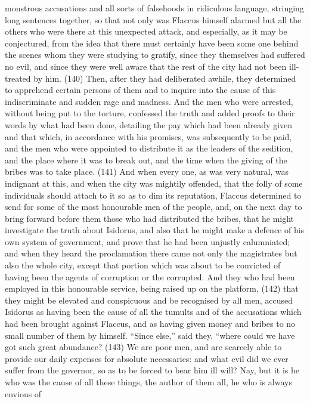 monstrous accusations and all sorts of falsehoods in ridiculous language, stringing long sentences
together, so that not only was Flaccus himself alarmed but all the others who were there at this
unexpected attack, and especially, as it may be conjectured, from the idea that there must certainly
have been some one behind the scenes whom they were studying to gratify, since they themselves
had suffered no evil, and since they were well aware that the rest of the city had not been ill-treated
by him. (140) Then, after they had deliberated awhile, they determined to apprehend certain
persons of them and to inquire into the cause of this indiscriminate and sudden rage and madness.
And the men who were arrested, without being put to the torture, confessed the truth and added
proofs to their words by what had been done, detailing the pay which had been already given and
that which, in accordance with his promises, was subsequently to be paid, and the men who were
appointed to distribute it as the leaders of the sedition, and the place where it was to break out, and
the time when the giving of the bribes was to take place. (141) And when every one, as was very
natural, was indignant at this, and when the city was mightily offended, that the folly of some
individuals should attach to it so as to dim its reputation, Flaccus determined to send for some of
the most honourable men of the people, and, on the next day to bring forward before them those
who had distributed the bribes, that he might investigate the truth about Isidorus, and also that he
might make a defence of his own system of government, and prove that he had been unjustly
calumniated; and when they heard the proclamation there came not only the magistrates but also
the whole city, except that portion which was about to be convicted of having been the agents of
corruption or the corrupted. And they who had been employed in this honourable service, being
raised up on the platform, (142) that they might be elevated and conspicuous and be recognised by
all men, accused Isidorus as having been the cause of all the tumults and of the accusations which
had been brought against Flaccus, and as having given money and bribes to no small number of
them by himself. ``Since else,'' said they, ``where could we have got such great abundance? (143)
We are poor men, and are scarcely able to provide our daily expenses for absolute necessaries:
and what evil did we ever suffer from the governor, so as to be forced to bear him ill will? Nay, but it
is he who was the cause of all these things, the author of them all, he who is always envious of
